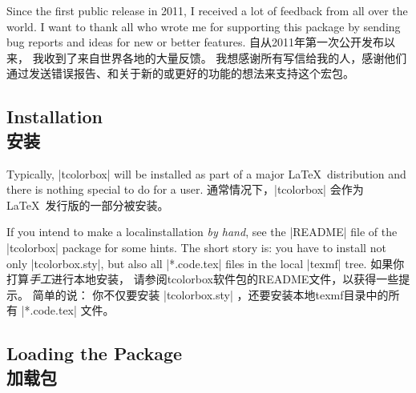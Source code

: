 \begin{tcolorbox}[enhanced,boxrule=0mm,boxsep=0mm,frame hidden,interior hidden,
left=0mm,right=0mm,top=0mm,bottom=0mm,watermark opacity=0.25,watermark zoom=1.2,before=\par\smallskip,
clip watermark=false,
watermark tikz={%
\path[fill=yellow,draw=yellow!75!red] (0,0) circle (1cm);
\fill[red] (45:5mm) circle (1mm);
\fill[red] (135:5mm) circle (1mm);
\draw[line width=1mm,red] (215:5mm) arc (215:325:5mm);}]
\begin{stripedbox}
Since the first public release in 2011, %
I received a lot of feedback from all over the world.%
I want to thank all who wrote me for supporting this package by sending bug reports and ideas for new or better features.
\tcblower
自从2011年第一次公开发布以来，%
我收到了来自世界各地的大量反馈。%
我想感谢所有写信给我的人，感谢他们通过发送错误报告、和关于新的或更好的功能的想法来支持这个宏包。
\end{stripedbox}
\end{tcolorbox}

\subsection{Installation\\安装}

\begin{stripedbox}
Typically, |tcolorbox| will be installed as part of a major \LaTeX\ distribution
and there is nothing special to do for a user.
\tcblower
通常情况下，|tcolorbox| 会作为%
\LaTeX\ 发行版的一部分被安装。%
\end{stripedbox}

\begin{stripedbox}
If you intend to make a localinstallation \emph{by hand}, %
see the |README| file of the |tcolorbox| package for some hints. %
The short story is: you have to install not only |tcolorbox.sty|, %
but also all |*.code.tex| files in the local |texmf| tree.
\tcblower
如果你打算\emph{手工}进行本地安装，%
请参阅tcolorbox软件包的README文件，以获得一些提示。%
简单的说： 你不仅要安装 |tcolorbox.sty| ，还要安装本地texmf目录中的所有 |*.code.tex| 文件。
\end{stripedbox}

% 
\subsection{Loading the Package\\加载包}


